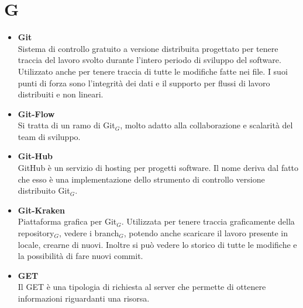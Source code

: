 \chapter{G} \label{G}
\begin{itemize}
	\item \textbf{Git}\\
	Sistema di controllo gratuito a versione distribuita progettato per tenere traccia del lavoro svolto durante l'intero periodo di sviluppo del software.
	Utilizzato anche per tenere traccia di tutte le modifiche fatte nei file.
	I suoi punti di forza sono l'integrità dei dati e il supporto per flussi di lavoro distribuiti e non lineari.

	\item \textbf{Git-Flow}\\
	Si tratta di un ramo di Git$_G$, molto adatto alla collaborazione e scalarità del team di sviluppo.
	
	\item \textbf{Git-Hub}\\
	GitHub è un servizio di hosting per progetti software. Il nome deriva dal fatto che esso è una implementazione dello strumento di controllo versione distribuito Git$_G$.
	
	\item \textbf{Git-Kraken}\\
	Piattaforma grafica per Git$_G$.
	Utilizzata per tenere traccia graficamente della repository$_G$, vedere i branch$_G$, potendo anche scaricare il lavoro presente in locale, crearne di nuovi.
	Inoltre si può vedere lo storico di tutte le modifiche e la possibilità di fare nuovi commit.
	
	\item \textbf{GET}\\
	Il GET è una tipologia di richiesta al server che permette di ottenere informazioni riguardanti una risorsa.
	\end{itemize}